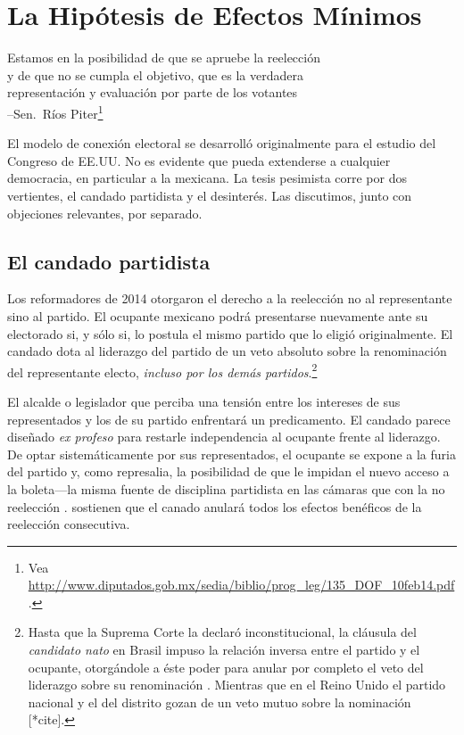 \documentclass[letter,12pt]{article}
\begin{document}
\section{La Hipótesis de Efectos Mínimos}

\begin{center}
\begin{singlespacing}
  Estamos en la posibilidad de que se apruebe la reelección\\
  y de que no se cumpla el objetivo, que es la verdadera\\
  representación y evaluación por parte de los votantes\\
  --Sen.\ Ríos Piter\footnote{Vea \url{http://www.diputados.gob.mx/sedia/biblio/prog_leg/135_DOF_10feb14.pdf}.}
\end{singlespacing}
\end{center}

\noindent El modelo de conexión electoral se desarrolló originalmente para el estudio del Congreso de EE.UU. No es evidente que pueda extenderse a cualquier democracia, en particular a la mexicana. La tesis pesimista corre por dos vertientes, el candado partidista y el desinterés. Las discutimos, junto con objeciones relevantes, por separado.

\subsection{El candado partidista}

\noindent Los reformadores de 2014 otorgaron el derecho a la reelección no al representante sino al partido. El ocupante mexicano podrá presentarse nuevamente ante su electorado si, y sólo si, lo postula el mismo partido que lo eligió originalmente. El candado dota al liderazgo del partido de un veto absoluto sobre la renominación del representante electo, \emph{incluso por los demás partidos}.\footnote{Hasta que la Suprema Corte la declaró inconstitucional, la cláusula del \emph{candidato nato} en Brasil impuso la relación inversa entre el partido y el ocupante, otorgándole a éste poder para anular por completo el veto del liderazgo sobre su renominación \citep{mainwaring.1991}. Mientras que en el Reino Unido el partido nacional y el del distrito gozan de un veto mutuo sobre la nominación [*cite].}

El alcalde o legislador que perciba una tensión entre los intereses de sus representados y los de su partido enfrentará un predicamento. El candado parece diseñado \emph{ex profeso} para restarle independencia al ocupante frente al liderazgo. De optar sistemáticamente por sus representados, el ocupante se expone a la furia del partido y, como represalia, la posibilidad de que le impidan el nuevo acceso a la boleta---la misma fuente de disciplina partidista en las cámaras que con la no reelección \citep{weldon.1997esp}. \citet{merinoFierroZarkin2013Blog} sostienen que el canado anulará todos los efectos benéficos de la reelección consecutiva. 
\end{document}

